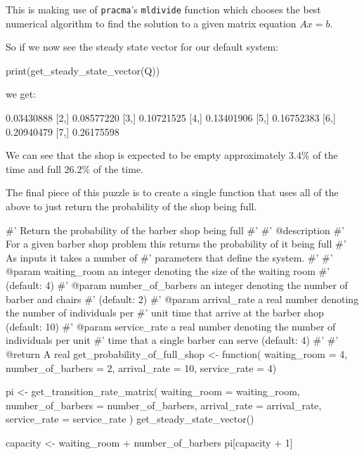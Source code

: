 This is making use of \texttt{pracma}'s \texttt{mldivide} function
which chooses the best numerical algorithm to find the solution to a given
matrix equation \(Ax=b\).

So if we now see the steady state vector for our default system:

\begin{Rin}
print(get_steady_state_vector(Q))
\end{Rin}

we get:

\begin{Rout}
           [,1]
[1,] 0.03430888
[2,] 0.08577220
[3,] 0.10721525
[4,] 0.13401906
[5,] 0.16752383
[6,] 0.20940479
[7,] 0.26175598
\end{Rout}

We can see that the shop is expected to be empty approximately 3.4\% of the time
and full 26.2\% of the time.

The final piece of this puzzle is to create a single function that uses all of
the above to just return the probability of the shop being full.

\begin{Rin}
#' Return the probability of the barber shop being full
#'
#' @description
#' For a given barber shop problem this returns the probability of it being full
#' As inputs it takes a number of
#' parameters that define the system.
#'
#' @param waiting_room an integer denoting the size of the waiting room
#' (default: 4)
#' @param number_of_barbers an integer denoting the number of barber and chairs
#' (default: 2)
#' @param arrival_rate a real number denoting the number of individuals per
#' unit time that arrive at the barber shop (default: 10)
#' @param service_rate a real number denoting the number of individuals per unit
#' time that a single barber can serve (default: 4)
#'
#' @return A real
get_probability_of_full_shop <- function(
                                         waiting_room = 4,
                                         number_of_barbers = 2,
                                         arrival_rate = 10,
                                         service_rate = 4) {
  pi <- get_transition_rate_matrix(
    waiting_room = waiting_room,
    number_of_barbers = number_of_barbers,
    arrival_rate = arrival_rate,
    service_rate = service_rate
  ) %
    get_steady_state_vector()

  capacity <- waiting_room + number_of_barbers
  pi[capacity + 1]
}
\end{Rin}

